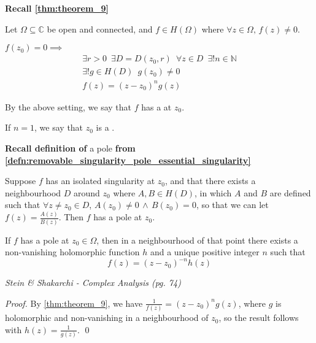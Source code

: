 \documentclass[notoc,notitlepage]{tufte-book}
\begin{document}
\textbf{Recall \cref{thm:theorem_9}}

Let $\Omega \subseteq \mathbb{C}$ be open and connected, and $f \in H(\Omega)$ where $\forall z \in \Omega, \, f(z) \neq 0$.

$f(z_0) = 0 \implies$
\begin{gather*}
	\exists r > 0 \enspace \exists D = D(z_0, r) \enspace \forall z \in D \enspace \exists! n \in \mathbb{N} \\
	\exists! g \in H(D) \enspace g(z_0) \neq 0 \\
	f(z) = (z - z_0)^n g(z)
\end{gather*}

\begin{defn}\label{defn:zero_of_order_n_&_simple_zero}
	By the above setting, we say that $f$ has a  at $z_0$.

	If $n = 1$, we say that $z_0$ is a .
\end{defn}

\textbf{Recall definition of} a pole \textbf{from \cref{defn:removable_singularity_pole_essential_singularity}}

Suppose $f$ has an isolated singularity at $z_0$, and that there exists a neighbourhood $D$ around $z_0$ where $A, B \in H(D)$, in which $A$ and $B$ are defined such that $\forall z \neq z_0 \in D$, $A(z_0) \neq 0 \, \land \, B(z_0) = 0$, so that we can let $f(z) = \frac{A(z)}{B(z)}$. Then $f$ has a pole at $z_0$.

\begin{thm}[Theorem 9.1]\label{thm:theorem_9.1}
	If $f$ has a pole at $z_0 \in \Omega$, then in a neighbourhood of that point there exists a non-vanishing holomorphic function $h$ and a unique positive integer $n$ such that
	\begin{equation*}
		f(z) = (z - z_0)^{-n} h(z)
	\end{equation*}
\end{thm}

\textit{Stein \& Shakarchi - Complex Analysis (pg. 74)}

\begin{proof}
	By \cref{thm:theorem_9}, we have $\frac{1}{f(z)} = (z - z_0)^n g(z)$, where $g$ is holomorphic and non-vanishing in a neighbourhood of $z_0$, so the result follows with $h(z) = \frac{1}{g(z)}$. \qed
\end{proof}
\end{document}
